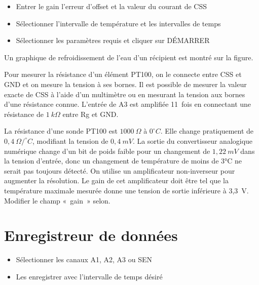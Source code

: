 \documentclass[a4paper,12pt,french]{sphinxmanual}
\let\sphinxpxdimen\pdfpxdimen\else\newdimen\sphinxpxdimen
\begin{document}
\noindent\sphinxincludegraphics[width=300\sphinxpxdimen]{{pt100}.pdf}
\noindent\sphinxincludegraphics[width=300\sphinxpxdimen]{{pt100-screen}.pdf}

\begin{itemize}
\item {} 
Entrer le gain l’erreur d’offset et la valeur du courant de CSS

\item {} 
Sélectionner l’intervalle de température et les intervalles de temps

\item {} 
Sélectionner les paramètres requis et cliquer sur DÉMARRER

\end{itemize}


Un graphique de refroidissement de l’eau d’un récipient est montré sur
la figure.

Pour mesurer la résistance d’un élément PT100, on le connecte entre CSS
et GND et on mesure la tension à ses bornes. Il est possible de mesurer
la valeur exacte de CSS à l’aide d’un multimètre ou en mesurant la
tension aux bornes d’une résistance connue. L’entrée de A3 est amplifiée
11 fois en connectant une résistance de \(1~k\Omega\) entre Rg et GND.

La résistance d’une sonde PT100 est \(1000~\Omega\) à \(0^\circ C\). Elle change
pratiquement de \(0,4~\Omega /^\circ C\), modifiant la tension de
\(0, 4~mV\). La
sortie du convertisseur analogique numérique change d’un bit de poids
faible pour un changement de \(1,22~mV\) dans la tension d’entrée, donc
un changement de température de moins de 3°C ne serait pas toujours
détecté. On utilise un amplificateur non-inverseur pour augmenter la
résolution. Le gain de cet amplificateur doit être tel que la
température maximale mesurée donne une tension de sortie inférieure à
3,3 V. Modifier le champ « gain » selon.


\section{Enregistreur de données}
\label{\detokenize{7.2:enregistreur-de-donnees}}\label{\detokenize{7.2::doc}}\begin{itemize}
\item {} 
Sélectionner les canaux A1, A2, A3 ou SEN

\item {} 
Les enregistrer avec l’intervalle de temps désiré

\end{itemize}
\end{document}
